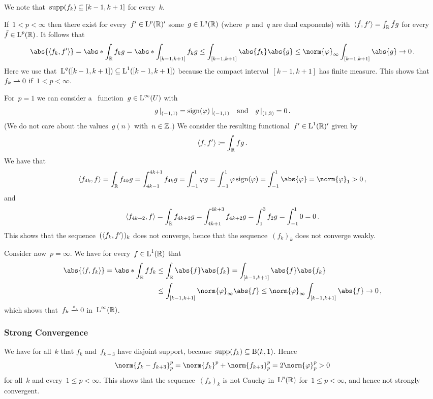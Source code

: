 We note that~$\supp(f_k) \subseteq [k-1,k+1]$ for every~$k$.

If~$1 < p < \infty$ then there exist for every~$f' \in \Lp^p(\Real)'$ some~$g \in \Lp^q(\Real)$ (where~$p$ and~$q$ are dual exponents) with~$\bil{\tilde{f},f'} = \int_{\Real} \tilde{f} g$ for every~$\tilde{f} \in \Lp^p(\Real)$.
It follows that
\[
        \abs{ \bil{f_k, f'} }
  =     \abs*{ \int_{\Real} f_k g }
  =     \abs*{ \int_{[k-1,k+1]} f_k g }
  \leq  \int_{[k-1,k+1]} \abs{f_k} \abs{g}
  \leq  \norm{\varphi}_\infty \int_{[k-1,k+1]} \abs{g}
  \to   0 \,.
\]
Here we use that~$\Lp^q([k-1,k+1]) \subseteq \Lp^1([k-1,k+1])$ because the compact interval~$[k-1,k+1]$ has finite measure.
This shows that~$f_k \wto 0$ if~$1 < p < \infty$.

For~$p = 1$ we can consider a~ function~$g \in \Lp^\infty(U)$ with
\[
    \restrict{g}{(-1,1)}
  = \restrict{\sign(\varphi)}{(-1,1)}
  \quad\text{and}\quad
    \restrict{g}{(1,3)}
  = 0 \,.
\]
(We do not care about the values~$g(n)$ with~$n \in \Integer$.)
We consider the resulting functional~$f' \in \Lp^1(\Real)'$ given by
\[
  \bil{f,f'}
  \defined
  \int_\Real f g \,.
\]
We have that
\[
    \bil{f_{4k}, f}
  = \int_{\Real} f_{4k} g
  = \int_{4k-1}^{4k+1} f_{4k} g
  = \int_{-1}^1 \varphi g
  = \int_{-1}^1 \varphi \sign(\varphi)
  = \int_{-1}^1 \abs{\varphi}
  = \norm{\varphi}_1
  > 0 \,,
\]
and
\[
    \bil{f_{4k+2}, f}
  = \int_{\Real} f_{4k+2} g
  = \int_{4k+1}^{4k+3} f_{4k+2} g
  = \int_1^3 f_2 g
  = \int_{-1}^1 0
  = 0 \,.
\]
This shows that the sequence~$(\bil{f_k, f'})_k$ does not converge, hence that the sequence~$(f_k)_k$ does not converge weakly.

Consider now~$p = \infty$.
We have for every~$f \in \Lp^1(\Real)$ that
\begin{align*}
        \abs{ \bil{f, f_k} }
   =    \abs*{ \int_{\Real} f f_k }
  &\leq \int_{\Real} \abs{f} \abs{f_k}
   =    \int_{[k-1,k+1]} \abs{f} \abs{f_k}  \\
  &\leq \int_{[k-1,k+1]} \norm{\varphi}_\infty \abs{f}
   \leq \norm{\varphi}_\infty \int_{[k-1,k+1]} \abs{f}
   \to  0 \,,
\end{align*}
which shows that~$f_k \wtostar 0$ in~$\Lp^\infty(\Real)$.




\subsubsection{Strong Convergence}

We have for all~$k$ that $f_k$ and~$f_{k+3}$ have disjoint support, because~$\supp(f_k) \subseteq \ball{1}{k}$.
Hence
\[
    \norm{f_k - f_{k+3}}_p^p
  = \norm{f_k}^p + \norm{f_{k+3}}_p^p
  = 2 \norm{\varphi}_p^p
  > 0
\]
for all~$k$ and every~$1 \leq p < \infty$.
This shows that the sequence~$(f_k)_k$ is not Cauchy in~$\Lp^p(\Real)$ for~$1 \leq p < \infty$, and hence not strongly convergent.

